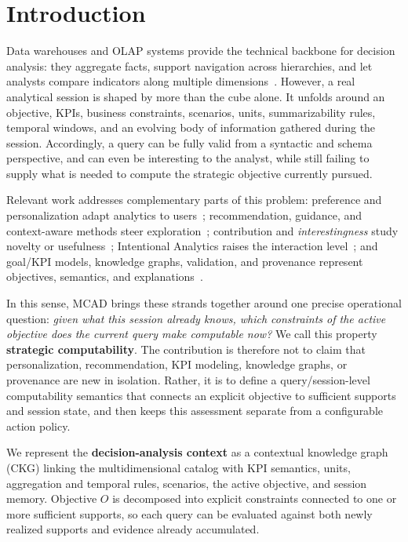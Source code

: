 \documentclass[journal]{IEEEtran}
\begin{document}
\section{Introduction}
\label{sec:intro}

Data warehouses and OLAP systems provide the technical backbone for decision analysis: they aggregate facts, support navigation across hierarchies, and let analysts compare indicators along multiple dimensions~\cite{ChaudhuriDayal97,KimballRoss2013,ChenBI2012}. However, a real analytical session is shaped by more than the cube alone. It unfolds around an objective, KPIs, business constraints, scenarios, units, summarizability rules, temporal windows, and an evolving body of information gathered during the session. Accordingly, a query can be fully valid from a syntactic and schema perspective, and can even be interesting to the analyst, while still failing to supply what is needed to compute the strategic objective currently pursued.

Relevant work addresses complementary parts of this problem: preference and personalization adapt analytics to users~\cite{GolfarelliRizziBiondi2011,JacobGunklachMaedche2025}; recommendation, guidance, and context-aware methods steer exploration~\cite{AligonDSS2015,NegreRavatTeste2018,GunklachNadj2023,RoyContextOLAP2022}; contribution and \emph{interestingness} study novelty or usefulness~\cite{DjedainiEtAl2019,GkitsakisEtAl2024,ArenasExploratory2025}; Intentional Analytics raises the interaction level~\cite{VassiliadisMarcelRizzi2019,FranciaPredict2026}; and goal/KPI models, knowledge graphs, validation, and provenance represent objectives, semantics, and explanations~\cite{Pourshahid2014,MateTrujilloMylopoulos2017,RoldanGarciaEtAl2021,DiamantiniKPISurvey2025,HoganKGSurvey2021,ZhongKGC2024,W3CSHACL2017,W3CPROVO2013}.

In this sense, MCAD brings these strands together around one precise operational question: \emph{given what this session already knows, which constraints of the active objective does the current query make computable now?} We call this property \textbf{strategic computability}. The contribution is therefore not to claim that personalization, recommendation, KPI modeling, knowledge graphs, or provenance are new in isolation. Rather, it is to define a query/session-level computability semantics that connects an explicit objective to sufficient supports and session state, and then keeps this assessment separate from a configurable action policy.

We represent the \textbf{decision-analysis context} as a contextual knowledge graph (CKG) linking the multidimensional catalog with KPI semantics, units, aggregation and temporal rules, scenarios, the active objective, and session memory. Objective $O$ is decomposed into explicit constraints connected to one or more sufficient supports, so each query can be evaluated against both newly realized supports and evidence already accumulated.
\end{document}
